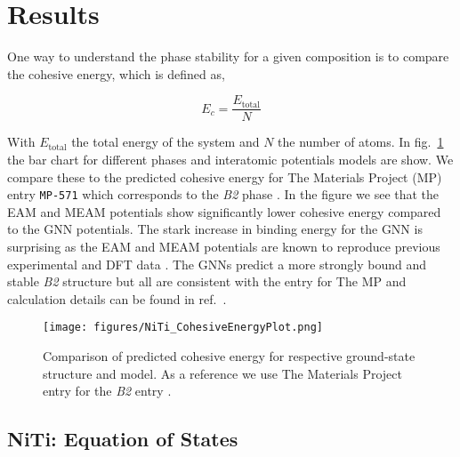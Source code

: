 \documentclass[preprint,colorlinks=true,linkcolor=black,citecolor=black]{elsarticle}
\begin{document}
\section{Results}
\label{sec:results}

One way to understand the phase stability for a given composition is to compare the cohesive energy, which is defined as,

\begin{equation}
  \label{eq:cohesive_energy}
  E_{c} = \frac{E_{\text{total}}}{N}
\end{equation}

With $E_{\text{total}}$ the total energy of the system and $N$ the number of atoms. In fig.~\ref{fig:ecoh} the bar chart for different phases and interatomic potentials models are show. We compare these to the predicted cohesive energy for The Materials Project (MP) entry \texttt{MP-571} which corresponds to the \textit{B2} phase \cite{MP--571}. In the figure we see that the EAM and MEAM potentials show significantly lower cohesive energy compared to the GNN potentials. The stark increase in binding energy for the GNN is surprising as the EAM and MEAM potentials are known to reproduce previous experimental and DFT data \cite{Haskins2016,Ko2015}. The GNNs predict a more strongly bound and stable \textit{B2} structure but all are consistent with the entry for The MP and calculation details can be found in ref.~\cite{MP--571}. \par

\begin{figure}[ht!]
    \begin{centering}
        \texttt{[image: figures/NiTi\_CohesiveEnergyPlot.png]}
        \caption{
          Comparison of predicted cohesive energy for respective ground-state structure and model. As a reference we use The Materials Project entry for the  \textit{B2} entry \cite{MP--571}.
        }
        \label{fig:ecoh}
    \end{centering}
\end{figure}

\subsection{NiTi: Equation of States}
\label{subsec:nitieos}
\end{document}
